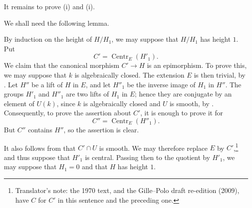 

It remains to prove (i) and (i).

We shall need the following lemma.


By induction on the height of \(H/H_1\), we may suppose that
\(H/H_1\) has height \(1\).  Put
\[
  C'=\operatorname{Centr}_E(H'_1).
\]
We claim that the canonical morphism \(C'\longrightarrow H\) is an
epimorphism.  To prove this, we may suppose that \(k\) is
algebraically closed.  The extension \(E\) is then trivial, by
.  Let \(H''\) be a lift of \(H\) in \(E\), and let
\(H''_1\) be the inverse image of \(H_1\) in \(H''\).  The groups
\(H'_1\) and \(H''_1\) are two lifts of \(H_1\) in \(E\); hence they
are conjugate by an element of \(U(k)\), since \(k\) is
algebraically closed and \(U\) is smooth, by .
Consequently, to prove the assertion about \(C'\), it is enough to
prove it for
\[
  C''=\operatorname{Centr}_E(H''_1).
\]
But \(C''\) contains \(H''\), so the assertion is clear.

It also follows from  that \(C'\cap U\) is smooth.  We may
therefore replace \(E\) by \(C'\),\footnote{Translator's note: the 1970 text, and the Gille--Polo draft re-edition (2009), have
\(C\) for \(C'\) in this sentence and the preceding one.} and thus suppose that \(H'_1\) is
central.  Passing then to the quotient by \(H'_1\), we may suppose
that \(H_1=0\) and that \(H\) has height \(1\).

